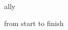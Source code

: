 \thispagestyle{empty}
\null
\vfill
\begin{flushright}
  \allyFont
  {\Large ally}

  \vfill
  
  from start to finish

  \vfill

  \null
\end{flushright}
\vfill
\cleardoublepage
